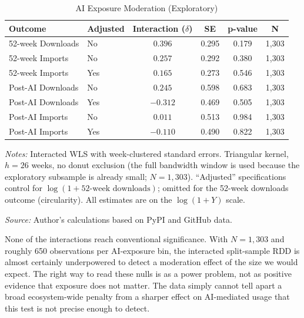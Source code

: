 \documentclass[12pt, a4paper]{report}
\begin{document}
\begin{table}[ht]
\centering
\caption{AI Exposure Moderation (Exploratory)}\label{tab:mechanism-app}
\small
\begin{threeparttable}
\begin{tabular}{llcccc}
\toprule
\textbf{Outcome} & \textbf{Adjusted} & \textbf{Interaction ($\delta$)} & \textbf{SE} & \textbf{p-value} & \textbf{N} \\ \midrule
52-week Downloads & No & $0.396$ & 0.295 & 0.179 & 1,303 \\
52-week Imports & No & $0.257$ & 0.292 & 0.380 & 1,303 \\
52-week Imports & Yes & $0.165$ & 0.273 & 0.546 & 1,303 \\
Post-AI Downloads & No & $0.245$ & 0.598 & 0.683 & 1,303 \\
Post-AI Downloads & Yes & $-0.312$ & 0.469 & 0.505 & 1,303 \\
Post-AI Imports & No & $0.011$ & 0.513 & 0.984 & 1,303 \\
Post-AI Imports & Yes & $-0.110$ & 0.490 & 0.822 & 1,303 \\ \bottomrule
\end{tabular}
\begin{tablenotes}
\small
\item \textit{Notes:} Interacted WLS with week-clustered standard errors. Triangular kernel, $h = 26$ weeks, no donut exclusion (the full bandwidth window is used because the exploratory subsample is already small; $N = 1{,}303$). ``Adjusted'' specifications control for $\log(1 + \text{52-week downloads})$; omitted for the 52-week downloads outcome (circularity). All estimates are on the $\log(1+Y)$ scale.
\item \textit{Source:} Author's calculations based on PyPI and GitHub data.
\end{tablenotes}
\end{threeparttable}
\end{table}

None of the interactions reach conventional significance. With $N = 1{,}303$ and roughly 650 observations per AI-exposure bin, the interacted split-sample RDD is almost certainly underpowered to detect a moderation effect of the size we would expect. The right way to read these nulls is as a power problem, not as positive evidence that exposure does not matter. The data simply cannot tell apart a broad ecosystem-wide penalty from a sharper effect on AI-mediated usage that this test is not precise enough to detect.
\end{document}
